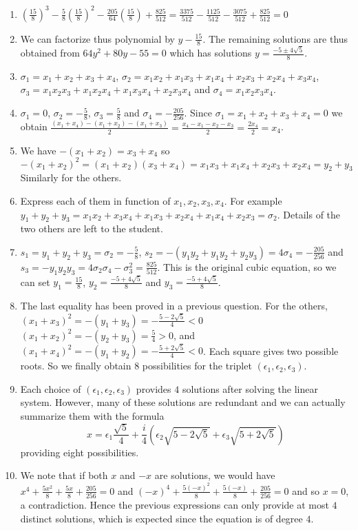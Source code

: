 \begin{enumerate}
\item $\left(\frac{15}{8}\right)^3-\frac{5}{8} \left(\frac{15}{8}\right)^2 -
  \frac{205}{64} \left(\frac{15}{8}\right) + \frac{825}{512} =
  \frac{3375}{512} - \frac{1125}{512} - \frac{3075}{512} + \frac{825}{512} = 0$
\item We can factorize thus polynomial by $y - \frac{15}{8}$.
  The remaining solutions are thus obtained from $64y^2+80y-55 = 0$ which
  has solutions $y=\frac{-5\pm4\sqrt{5}}{8}$.
\item $\sigma_1 = x_1+x_2+x_3+x_4$,
  $\sigma_2 = x_1x_2+x_1x_3+x_1x_4+x_2x_3+x_2x_4+x_3x_4$,
  $\sigma_3 = x_1x_2x_3 + x_1x_2x_4 + x_1 x_3x_4 + x_2x_3x_4$
  and $\sigma_4=x_1x_2x_3x_4$.
\item $\sigma_1=0$, $\sigma_2=-\frac{5}{8}$, $\sigma_3=\frac{5}{8}$
  and $\sigma_4=-\frac{205}{256}$.
  Since $\sigma_1 = x_1+x_2+x_3+x_4=0$ we obtain
  $\frac{{(x_1+x_4)} - {(x_1+x_2)} - {(x_1+x_3)}}{2} =
  \frac{x_4-x_1-x_2-x_3}{2} = \frac{2x_4}{2} = x_4$.
\item We have $-{(x_1+x_2)} = x_3+x_4$ so
  $-{(x_1+x_2)}^2 = {(x_1+x_2)}{(x_3+x_4)}=x_1x_3+x_1x_4+x_2x_3+x_2x_4=y_2+y_3$
  Similarly for the others.
\item Express each of them in function of $x_1,x_2,x_3,x_4$.
  For example $y_1+y_2+y_3=x_1x_2+x_3x_4+x_1x_3+x_2x_4+x_1x_4+x_2x_3=\sigma_2$.
  Details of the two others are left to the student.
\item $s_1 = y_1+y_2+y_3 = \sigma_2 = -\frac{5}{8}$,
  $s_2 = -{(y_1y_2+y_1y_2+y_2y_3)}=4\sigma_4=-\frac{205}{256}$
  and $s_3=-y_1y_2y_3=4\sigma_2\sigma_4-\sigma_3^2=\frac{825}{512}$.
  This is the original cubic equation, so we can set
  $y_1=\frac{15}{8}$,
  $y_2=\frac{-5+4\sqrt{5}}{8}$ and $y_3=\frac{-5+4\sqrt{5}}{8}$.
\item
  The last equality has been proved in a previous question. For the others,
  ${(x_1+x_3)}^2 = -{(y_1+y_3)} = -\frac{5-2\sqrt{5}}{4} < 0$
  ${(x_1+x_2)}^2 = -{(y_2+y_3)} = \frac{5}{4} > 0$,
  and ${(x_1+x_4)}^2 = -{(y_1+y_2)} = -\frac{5+2\sqrt{5}}{4} < 0$. Each square
  gives two possible roots. So we finally obtain 8 possibilities
  for the triplet $(\epsilon_1,\epsilon_2,\epsilon_3)$.
\item Each choice of $(\epsilon_1,\epsilon_2,\epsilon_3)$ provides $4$ solutions
  after solving the linear system. However, many of these solutions are
  redundant and we can actually summarize them with the formula
    $$x=\epsilon_1\frac{\sqrt{5}}{4}+
    \frac{i}{4} \left(\epsilon_2 \sqrt{5-2\sqrt{5}}+
    \epsilon_3 \sqrt{5+2\sqrt{5}} \right)$$
  providing eight possibilities.
\item We note that if both $x$ and $-x$ are solutions, we would have
  $x^4+\frac{5x^2}{8}+\frac{5x}{8}+\frac{205}{256} = 0$ and
  ${(-x)}^4+\frac{5{(-x)}^2}{8}+\frac{5{(-x)}}{8}+\frac{205}{256} = 0$
  and so $x = 0$, a contradiction. Hence the previous expressions can
  only provide at most $4$ distinct solutions, which is expected since
  the equation is of degree $4$.
\end{enumerate}


